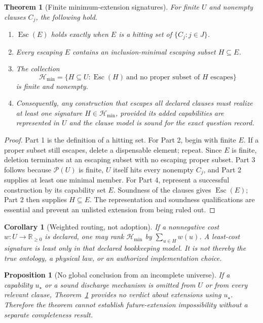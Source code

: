 \documentclass[11pt]{article}
\newtheorem{theorem}{Theorem}
\newtheorem{proposition}{Proposition}
\newtheorem{corollary}{Corollary}
\newcommand{\powerset}{\mathcal{P}}
\begin{document}
\begin{theorem}[Finite minimum-extension signatures]
\label{thm:hitting}
For finite $U$ and nonempty clauses $C_j$, the following hold.
\begin{enumerate}
  \item $\operatorname{Esc}(E)$ holds exactly when $E$ is a hitting set of
  $\{C_j:j\in J\}$.
  \item Every escaping $E$ contains an inclusion-minimal escaping subset
  $H\subseteq E$.
  \item The collection
  \[
    \mathcal{H}_{\min}=
    \{H\subseteq U:\operatorname{Esc}(H)\ \text{and no proper subset of }H
      \text{ escapes}\}
  \]
  is finite and nonempty.
  \item Consequently, any construction that escapes all declared clauses must
  realize at least one signature $H\in\mathcal{H}_{\min}$, provided its added
  capabilities are represented in $U$ and the clause model is sound for the
  exact question record.
\end{enumerate}
\end{theorem}

\begin{proof}
Part 1 is the definition of a hitting set.  For Part 2, begin with finite $E$.
If a proper subset still escapes, delete a dispensable element; repeat.  Since
$E$ is finite, deletion terminates at an escaping subset with no escaping
proper subset.  Part 3 follows because $\powerset(U)$ is finite, $U$ itself
hits every nonempty $C_j$, and Part 2 supplies at least one minimal member.
For Part 4, represent a successful construction by its capability set $E$.
Soundness of the clauses gives $\operatorname{Esc}(E)$; Part 2 then supplies
$H\subseteq E$.  The representation and soundness qualifications are
essential and prevent an unlisted extension from being ruled out.
\end{proof}

\begin{corollary}[Weighted routing, not adoption]
If a nonnegative cost $w:U\to\mathbb{R}_{\geq0}$ is declared, one may rank
$\mathcal{H}_{\min}$ by $\sum_{u\in H}w(u)$.  A least-cost signature is least
only in that declared bookkeeping model.  It is not thereby the true ontology,
a physical law, or an authorized implementation choice.
\end{corollary}

\begin{proposition}[No global conclusion from an incomplete universe]
If a capability $u_\star$ or a sound discharge mechanism is omitted from $U$
or from every relevant clause, Theorem~\ref{thm:hitting} provides no verdict
about extensions using $u_\star$.  Therefore the theorem cannot establish
future-extension impossibility without a separate completeness result.
\end{proposition}
\end{document}
